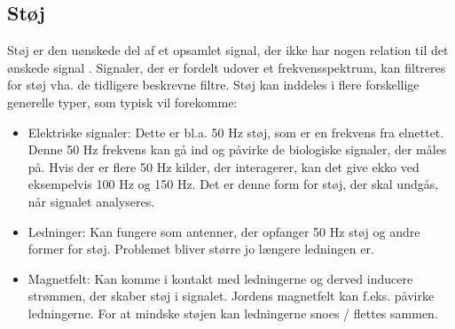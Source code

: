 \subsection{Støj}
Støj er den uønskede del af et opsamlet signal, der ikke har nogen relation til det ønskede signal . Signaler, der er fordelt udover et frekvensspektrum, kan filtreres for støj vha. de tidligere beskrevne filtre. \cite{Devasahayam2000}
Støj kan inddeles i flere forskellige generelle typer, som typisk vil forekomme:

\begin{itemize}
\item Elektriske signaler: Dette er bl.a. 50 Hz støj, som er en frekvens fra elnettet. Denne 50 Hz frekvens kan gå ind og påvirke de biologiske signaler, der måles på. Hvis der er flere 50 Hz kilder, der interagerer, kan det give ekko ved eksempelvis 100 Hz og 150 Hz. Det er denne form for støj, der skal undgås, når signalet analyseres.
\item Ledninger: Kan fungere som antenner, der opfanger 50 Hz støj og andre former for støj. Problemet bliver større jo længere ledningen er. 
\item Magnetfelt: Kan komme i kontakt med ledningerne og derved inducere strømmen, der skaber støj i signalet. Jordens magnetfelt kan f.eks. påvirke ledningerne. For at mindske støjen kan ledningerne snoes / flettes sammen.
\end{itemize} 